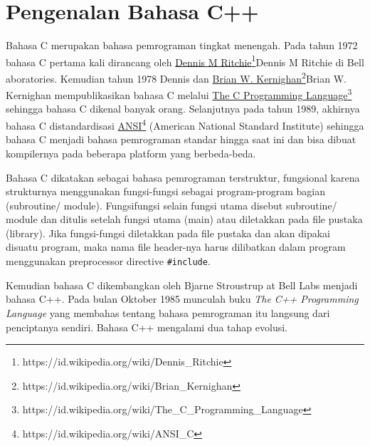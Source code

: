 
\section{Pengenalan Bahasa C++}\label{pengenalan-bahasa-cpp}

Bahasa C merupakan bahasa pemrograman tingkat menengah. Pada tahun 1972
bahasa C pertama kali dirancang oleh 
\href{https://id.wikipedia.org/wiki/Dennis_Ritchie}{Dennis M Ritchie}\footnote{https://id.wikipedia.org/wiki/Dennis\_Ritchie}{Dennis M Ritchie} di
Bell aboratories. Kemudian tahun 1978 Dennis dan 
\href{https://id.wikipedia.org/wiki/Brian_Kernighan}{Brian W. Kernighan}\footnote{https://id.wikipedia.org/wiki/Brian\_Kernighan}{Brian W. Kernighan}
mempublikasikan bahasa C melalui 
\href{https://id.wikipedia.org/wiki/The_C_Programming_Language}{The C
Programming Language}\footnote{https://id.wikipedia.org/wiki/The\_C\_Programming\_Language} sehingga bahasa C dikenal banyak orang.
Selanjutnya pada tahun 1989, akhirnya bahasa C distandardisasi 
\href{https://id.wikipedia.org/wiki/ANSI_C}{ANSI}\footnote{https://id.wikipedia.org/wiki/ANSI\_C} (American National
Standard Institute) sehingga bahasa C menjadi bahasa pemrograman standar
hingga saat ini dan bisa dibuat kompilernya pada beberapa platform yang
berbeda-beda.

Bahasa C dikatakan sebagai bahasa pemrograman terstruktur, fungsional
karena strukturnya menggunakan fungsi-fungsi sebagai program-program
bagian (subroutine/ module). Fungsifungsi selain fungsi utama disebut
subroutine/ module dan ditulis setelah fungsi utama (main) atau
diletakkan pada file pustaka (library). Jika fungsi-fungsi diletakkan
pada file pustaka dan akan dipakai disuatu program, maka nama file
header-nya harus dilibatkan dalam program menggunakan preprocessor
directive \texttt{\#include}.

Kemudian bahasa C dikembangkan oleh Bjarne Stroustrup at Bell Labs
menjadi bahasa C++. Pada bulan Oktober 1985 munculah buku \emph{The C++
Programming Language} yang membahas tentang bahasa pemrograman itu
langsung dari penciptanya sendiri. Bahasa C++ mengalami dua tahap
evolusi.

